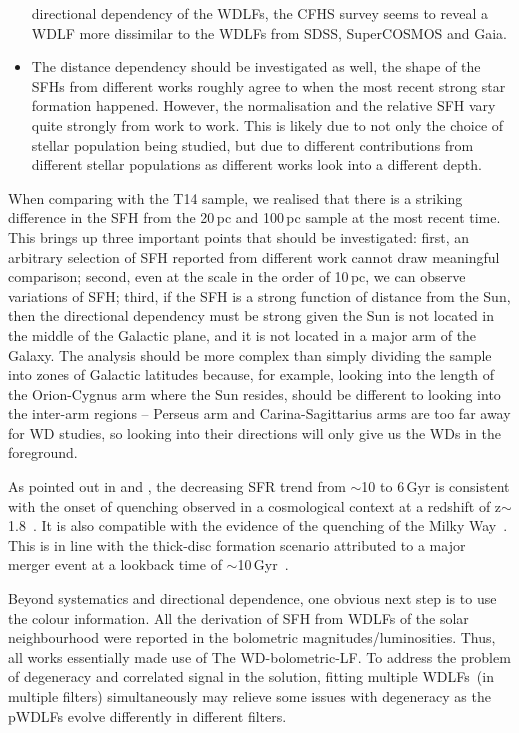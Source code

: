 \documentclass[fleqn,usenatbib]{mnras}
\begin{document}
\begin{itemize}
    directional dependency of the WDLFs, the CFHS survey seems to reveal a
    WDLF more dissimilar to the WDLFs from SDSS, SuperCOSMOS and Gaia.
    \item The distance dependency should be investigated as well, the shape of
    the SFHs from different works roughly agree to when the most recent strong
    star formation happened. However, the normalisation and the relative SFH
    vary quite strongly from work to work. This is likely due to not only the
    choice of stellar population being studied, but due to different
    contributions from different stellar populations as different works look
    into a different depth.
\end{itemize}

When comparing with the T14 sample, we realised that there is a striking 
difference in the SFH from the 20\,pc and 100\,pc sample at the most recent
time. This brings up three important points that should be investigated: first,
an arbitrary selection of SFH reported from different work cannot draw
meaningful comparison; second, even at the scale in the order of 10\,pc, we
can observe variations of SFH; third, if the SFH is a strong function of
distance from the Sun, then the directional dependency must be strong given the
Sun is not located in the middle of the Galactic plane, and it is not located
in a major arm of the Galaxy. The analysis should be more complex than simply
dividing the sample into zones of Galactic latitudes because, for example,
looking into the length of the Orion-Cygnus arm where the Sun resides, should
be different to looking into the inter-arm regions -- Perseus arm and
Carina-Sagittarius arms are too far away for WD studies, so looking into their
directions will only give us the WDs in the foreground.

As pointed out in \citet{2019A&A...624L...1M} and \citet{2019ApJ...878L..11I},
the decreasing SFR trend from $\sim$10 to 6\,Gyr is consistent with the
onset of quenching observed in a cosmological context at a redshift of
z$\sim$1.8~\citep[corresponds to a lookback time of
$\sim$10\,Gyr, e.g.][]{2016MNRAS.461.1100R, 2017MNRAS.471.4155K}. It is
also compatible with the evidence of the quenching of the Milky
Way~\citep{2016A&A...589A..66H}. This is in line with the thick-disc formation
scenario attributed to a major merger event at a lookback time of 
$\sim$10\,Gyr~\citep{2018Natur.563...85H}.

Beyond systematics and directional dependence, one obvious next step is to use
the colour information. All the derivation of SFH from WDLFs of the solar 
neighbourhood were reported in the bolometric magnitudes/luminosities. Thus,
all works essentially made use of The WD-bolometric-LF. To address the problem
of degeneracy and correlated signal in the solution, fitting multiple WDLFs~(in 
multiple filters) simultaneously may relieve some issues with degeneracy as the
pWDLFs evolve differently in different filters.
\end{document}
